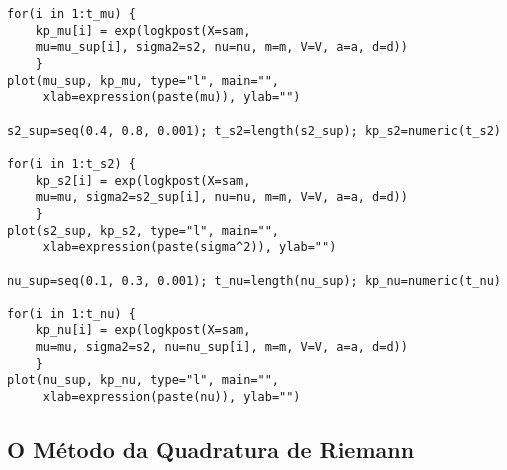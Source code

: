 \begin{verbatim}
for(i in 1:t_mu) {
	kp_mu[i] = exp(logkpost(X=sam,
	mu=mu_sup[i], sigma2=s2, nu=nu, m=m, V=V, a=a, d=d))
	}
plot(mu_sup, kp_mu, type="l", main="",
     xlab=expression(paste(mu)), ylab="")

s2_sup=seq(0.4, 0.8, 0.001); t_s2=length(s2_sup); kp_s2=numeric(t_s2)

for(i in 1:t_s2) {
	kp_s2[i] = exp(logkpost(X=sam,
	mu=mu, sigma2=s2_sup[i], nu=nu, m=m, V=V, a=a, d=d))
	}
plot(s2_sup, kp_s2, type="l", main="",
	 xlab=expression(paste(sigma^2)), ylab="")

nu_sup=seq(0.1, 0.3, 0.001); t_nu=length(nu_sup); kp_nu=numeric(t_nu)

for(i in 1:t_nu) {
	kp_nu[i] = exp(logkpost(X=sam,
	mu=mu, sigma2=s2, nu=nu_sup[i], m=m, V=V, a=a, d=d))
	}
plot(nu_sup, kp_nu, type="l", main="",
     xlab=expression(paste(nu)), ylab="")
\end{verbatim}

\subsection*{O Método da Quadratura de Riemann}

